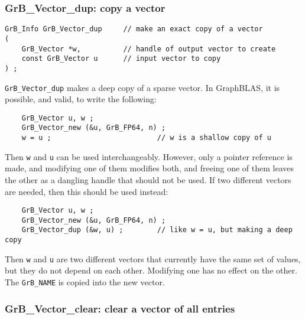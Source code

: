 \documentclass[12pt]{article}
\begin{document}
\newpage
\subsubsection{{\sf GrB\_Vector\_dup:}           copy a vector}
\label{vector_dup}

\begin{mdframed}[userdefinedwidth=6in]
{\footnotesize
\begin{verbatim}
GrB_Info GrB_Vector_dup     // make an exact copy of a vector
(
    GrB_Vector *w,          // handle of output vector to create
    const GrB_Vector u      // input vector to copy
) ;
\end{verbatim}
} \end{mdframed}

\verb'GrB_Vector_dup' makes a deep copy of a sparse vector.
In GraphBLAS, it is possible, and valid, to write the following:

    {\footnotesize
    \begin{verbatim}
    GrB_Vector u, w ;
    GrB_Vector_new (&u, GrB_FP64, n) ;
    w = u ;                         // w is a shallow copy of u  \end{verbatim}}

Then \verb'w' and \verb'u' can be used interchangeably.  However, only a pointer
reference is made, and modifying one of them modifies both, and freeing one of
them leaves the other as a dangling handle that should not be used.
If two different vectors are needed, then this should be used instead:

    {\footnotesize
    \begin{verbatim}
    GrB_Vector u, w ;
    GrB_Vector_new (&u, GrB_FP64, n) ;
    GrB_Vector_dup (&w, u) ;        // like w = u, but making a deep copy \end{verbatim}}

Then \verb'w' and \verb'u' are two different vectors that currently have the
same set of values, but they do not depend on each other.  Modifying one has
no effect on the other.
The \verb'GrB_NAME' is copied into the new vector.

\subsubsection{{\sf GrB\_Vector\_clear:}         clear a vector of all entries}
\label{vector_clear}
\end{document}
